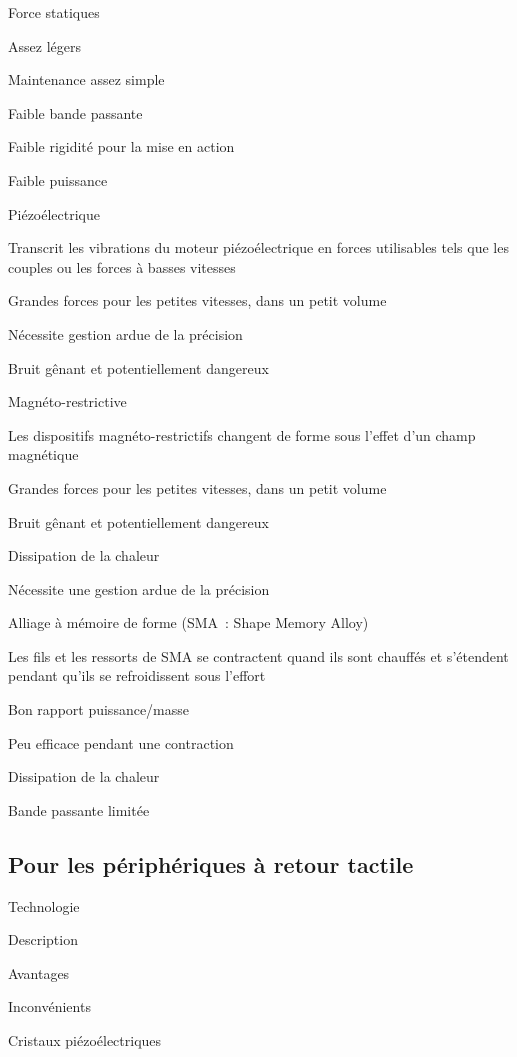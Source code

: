 \documentclass[
]{book}
\begin{document}
Force statiques

Assez légers

Maintenance assez simple

Faible bande passante

Faible rigidité pour la mise en
action

Faible puissance

Piézoélectrique

Transcrit les vibrations du moteur
piézoélectrique en forces utilisables tels que les couples ou les
forces à basses vitesses

Grandes forces pour les petites vitesses,
dans un petit volume

Nécessite gestion ardue de la
précision

Bruit gênant et potentiellement
dangereux

Magnéto-restrictive

Les dispositifs magnéto-restrictifs
changent de forme sous l'effet d'un champ magnétique

Grandes forces pour les petites vitesses,
dans un petit volume

Bruit gênant et potentiellement
dangereux

Dissipation de la chaleur

Nécessite une gestion ardue de la
précision

Alliage à mémoire de forme (SMA~:
Shape Memory Alloy)

Les fils et les ressorts de SMA se
contractent quand ils sont chauffés et s'étendent pendant qu'ils se
refroidissent sous l'effort

Bon rapport puissance/masse

Peu efficace pendant une contraction

Dissipation de la chaleur

Bande passante limitée

\hypertarget{pour-les-puxe9riphuxe9riques-uxe0-retour-tactile}{%
\subsection{Pour les périphériques à retour tactile}\label{pour-les-puxe9riphuxe9riques-uxe0-retour-tactile}}

Technologie

Description

Avantages

Inconvénients

Cristaux piézoélectriques
\end{document}

